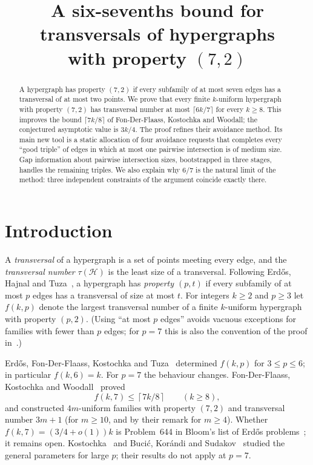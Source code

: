 \documentclass[11pt]{article}
\title{A six-sevenths bound for transversals of hypergraphs\\ with property $(7,2)$}
\author{}
\date{}
\numberwithin{equation}{section}
\theoremstyle{definition}
\theoremstyle{remark}
\newcommand{\HH}{\mathcal H}
\newcommand{\ceil}[1]{\left\lceil #1\right\rceil}
\begin{document}
\maketitle

\begin{abstract}
A hypergraph has property $(7,2)$ if every subfamily of at most seven
edges has a transversal of at most two points. We prove that every
finite $k$-uniform hypergraph with property $(7,2)$ has transversal
number at most $\lceil 6k/7\rceil$ for every $k\ge8$. This improves the
bound $\lceil 7k/8\rceil$ of Fon-Der-Flaass, Kostochka and Woodall; the
conjectured asymptotic value is $3k/4$. The proof refines their
avoidance method. Its main new tool is a static allocation of
four avoidance requests that completes every ``good triple'' of edges
in which at most one pairwise intersection is of medium size. Gap
information about pairwise intersection sizes, bootstrapped in three
stages, handles the remaining triples. We also explain why $6/7$ is the natural
limit of the method: three independent constraints of the argument
coincide exactly there.
\end{abstract}

\section{Introduction}\label{sec:intro}

A \emph{transversal} of a hypergraph is a set of points meeting every
edge, and the \emph{transversal number} $\tau(\HH)$ is the least size
of a transversal. Following Erd\H{o}s, Hajnal and Tuza~\cite{EHT}, a
hypergraph has \emph{property $(p,t)$} if every subfamily of at most $p$
edges has a transversal of size at most $t$. For integers $k\ge2$ and
$p\ge3$ let $f(k,p)$ denote the largest transversal number of a finite
$k$-uniform hypergraph with property $(p,2)$. (Using ``at most $p$
edges'' avoids vacuous exceptions for families with fewer than $p$
edges; for $p=7$ this is also the convention of the proof
in~\cite{FKW}.)

Erd\H{o}s, Fon-Der-Flaass, Kostochka and Tuza~\cite{EFKT} determined
$f(k,p)$ for $3\le p\le6$; in particular $f(k,6)=k$. For $p=7$ the
behaviour changes. Fon-Der-Flaass, Kostochka and Woodall~\cite{FKW}
proved
\[
 f(k,7)\le\ceil{7k/8}\qquad(k\ge8),
\]
and constructed $4m$-uniform families with property $(7,2)$ and
transversal number $3m+1$ (for $m\ge10$, and by their remark for $m\ge4$).
Whether $f(k,7)=(3/4+o(1))k$ is Problem~644 in Bloom's list of Erd\H{o}s
problems~\cite{Bloom}; it remains open. Kostochka~\cite{Kostochka} and
Buci\'c, Kor\'andi and Sudakov~\cite{BKS} studied the general parameters
for large $p$; their results do not apply at $p=7$.
\end{document}
